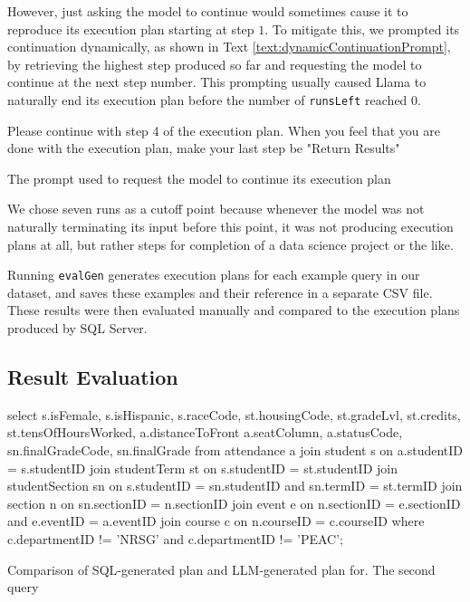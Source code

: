 However, just asking the model to continue would sometimes cause it to reproduce its execution plan starting at step $1$. To mitigate this, we prompted its continuation dynamically, as shown in Text \ref{text:dynamicContinuationPrompt}, by retrieving the highest step produced so far and requesting the model to continue at the next step number. This prompting usually caused Llama to naturally end its execution plan before the number of \lstinline{runsLeft} reached $0$.

\begin{text}
  Please continue with step 4 of the execution plan. When you feel that you are done with the execution plan, make your last step be "Return Results"
  \caption{The prompt used to request the model to continue its execution plan}
  \label{text:dynamicContinuationPrompt}
\end{text}

We chose seven runs as a cutoff point because whenever the model was not naturally terminating its input before this point, it was not producing execution plans at all, but rather steps for completion of a data science project or the like.

Running \lstinline{evalGen} generates execution plans for each example query in our dataset, and saves these examples and their reference in a separate CSV file. These results were then evaluated manually and compared to the execution plans produced by SQL Server.

\subsection{Result Evaluation}
\begin{text}
  \ContinuedFloat*
  select s.isFemale, s.isHispanic, s.raceCode, st.housingCode, st.gradeLvl, st.credits, st.tensOfHoursWorked, a.distanceToFront a.seatColumn, a.statusCode, sn.finalGradeCode, sn.finalGrade from attendance a join student s on a.studentID = s.studentID join studentTerm st on s.studentID = st.studentID join studentSection sn on s.studentID = sn.studentID and sn.termID = st.termID join section n on sn.sectionID = n.sectionID join event e on n.sectionID = e.sectionID and e.eventID = a.eventID join course c on n.courseID = c.courseID where c.departmentID != 'NRSG' and c.departmentID != 'PEAC';
  \caption{Comparison of SQL-generated plan and LLM-generated plan for. The second query}
  \label{text:sqlVsLlamaPlan2}
\end{text}

